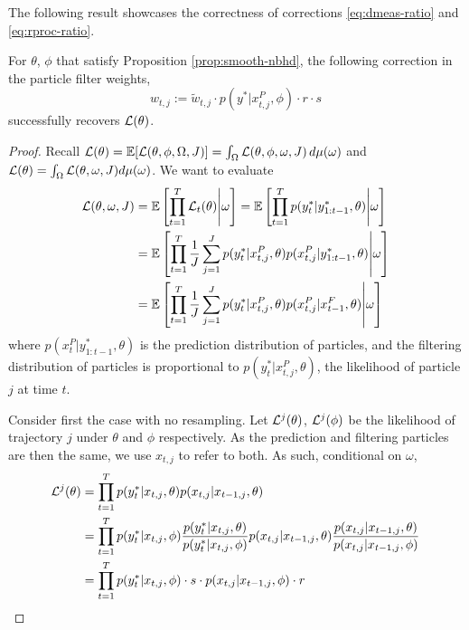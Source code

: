 \documentclass{article}
\begin{document}
The following result showcases the correctness of corrections \ref{eq:dmeas-ratio} and \ref{eq:rproc-ratio}.

\begin{lem}
    For $\theta$, $\phi$ that satisfy Proposition \ref{prop:smooth-nbhd}, the following correction in the particle filter weights,
    \begin{equation}
        w_{t,j} := \tilde{w}_{t,j} \cdot p(y^*|x_{t,j}^P,\phi)\cdot r \cdot s
    \end{equation}
    successfully recovers $\mathcal{L}(\theta)$.
\end{lem}

\begin{proof}
    Recall $\mathcal{L}(\theta) = \mathbb{E}[\mathcal{L}(\theta,\phi,\Omega, J)]=\int_\Omega \mathcal{L}(\theta,\phi,\omega, J)\, d\mu(\omega)$ and $\mathcal{L}(\theta) = \int_\Omega \mathcal{L}(\theta, \omega, J) d\mu(\omega)$. We want to evaluate
    \begin{align*}
        \mathcal{L}(\theta,\omega, J)
        &= \mathbb{E}\left[ \prod_{t=1}^T \mathcal{L}_t(\theta) \middle| \omega\right]
        = \mathbb{E}\left[ \prod_{t=1}^T p(y_t^*|y_{1:t-1}^*,\theta) \middle| \omega\right] \\
        &= \mathbb{E}\left[ \prod_{t=1}^T \frac{1}{J} \sum_{j=1}^J  p(y_t^*|x_{t,j}^P,\theta) p(x_{t,j}^P|y_{1:t-1}^*,\theta) \middle| \omega\right] \\
        &= \mathbb{E}\left[ \prod_{t=1}^T\frac{1}{J}  \sum_{j=1}^J  p(y_t^*|x_{t,j}^P,\theta) p(x_{t,j}^P|x_{t-1}^F,\theta) \middle| \omega\right] 
    \end{align*}
    where $p(x_t^P|y_{1:t-1}^*,\theta)$ is the prediction distribution of particles, and the filtering distribution of particles is proportional to $p(y_t^*|x_{t,j}^P,\theta)$, the likelihood of particle $j$ at time $t$.
    
    Consider first the case with no resampling. Let $\mathcal{L}^j(\theta)$, $\mathcal{L}^j(\phi)$ be the likelihood of trajectory $j$ under $\theta$ and $\phi$ respectively. As the prediction and filtering particles are then the same, we use $x_{t,j}$ to refer to both. As such, conditional on $\omega$,
    \begin{align*}
        \mathcal{L}^j(\theta) 
        &= \prod_{t=1}^T p(y_t^*|x_{t,j}, \theta) p(x_{t,j}|x_{t-1,j}, \theta) \\
        &= \prod_{t=1}^T p(y_t^*|x_{t,j}, \phi) \frac{p(y_t^*|x_{t,j}, \theta)}{p(y_t^*|x_{t,j}, \phi)} p(x_{t,j}|x_{t-1,j}, \theta) \frac{p(x_{t,j}|x_{t-1,j}, \theta) }{p(x_{t,j}|x_{t-1,j}, \phi) } \\
        &= \prod_{t=1}^T p(y_t^*|x_{t,j}, \phi) \cdot s \cdot p(x_{t,j}|x_{t-1,j}, \phi)\cdot r
    \end{align*}
    

\end{proof}
\end{document}

